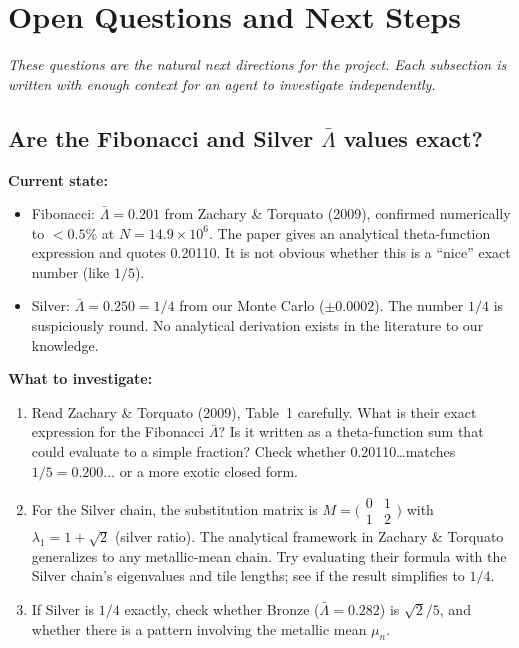 \documentclass[11pt,letterpaper]{article}
\begin{document}
\section{Open Questions and Next Steps}

\textit{These questions are the natural next directions for the project.
Each subsection is written with enough context for an agent to investigate independently.}

\subsection{Are the Fibonacci and Silver $\bar\Lambda$ values exact?}

\textbf{Current state:}
\begin{itemize}[leftmargin=1.5em]
  \item Fibonacci: $\bar\Lambda = 0.201$ from Zachary \& Torquato (2009), confirmed numerically
    to $<0.5\%$ at $N=14.9\times10^6$.
    The paper gives an analytical theta-function expression and quotes 0.20110.
    It is not obvious whether this is a ``nice'' exact number (like $1/5$).
  \item Silver: $\bar\Lambda = 0.250 = 1/4$ from our Monte Carlo ($\pm0.0002$).
    The number $1/4$ is suspiciously round. No analytical derivation exists in the
    literature to our knowledge.
\end{itemize}

\textbf{What to investigate:}
\begin{enumerate}[leftmargin=2em]
  \item Read Zachary \& Torquato (2009), Table~1 carefully. What is their exact expression
    for the Fibonacci $\bar\Lambda$? Is it written as a theta-function sum that could
    evaluate to a simple fraction? Check whether 0.20110\ldots matches $1/5 = 0.200\ldots$
    or a more exotic closed form.
  \item For the Silver chain, the substitution matrix is $M=\bigl(\begin{smallmatrix}0&1\\1&2\end{smallmatrix}\bigr)$
    with $\lambda_1=1+\sqrt2$ (silver ratio). The analytical framework in Zachary \& Torquato
    generalizes to any metallic-mean chain. Try evaluating their formula with the Silver
    chain's eigenvalues and tile lengths; see if the result simplifies to $1/4$.
  \item If Silver is $1/4$ exactly, check whether Bronze ($\bar\Lambda=0.282$) is $\sqrt2/5$,
    and whether there is a pattern involving the metallic mean $\mu_n$.
\end{enumerate}
\end{document}
